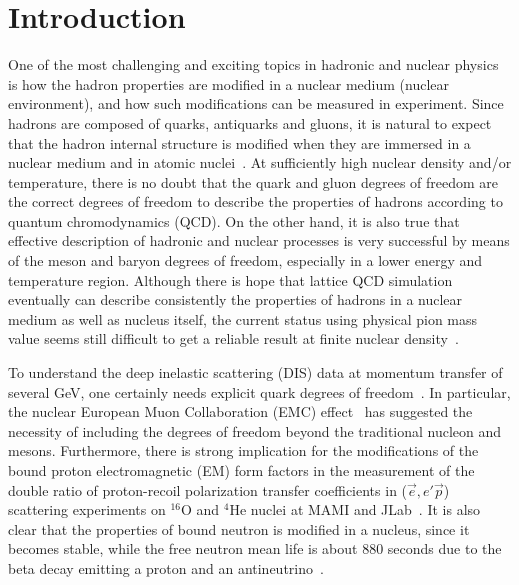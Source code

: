 \documentclass[preprint,aps,showpacs,floatfix]{revtex4}
\begin{document}
\section{Introduction}
\label{intro}


One of the most challenging and exciting topics in hadronic and nuclear physics is 
how the hadron properties are modified in a nuclear medium (nuclear environment), 
and how such modifications can be measured in experiment.
Since hadrons are composed of quarks, antiquarks and gluons, it is natural to expect that 
the hadron internal structure is modified when they are immersed in a nuclear medium   
and in atomic nuclei~\cite{Brown,Hatsuda,Guichon,QMCreview,Hayano,Brooks,Krein:2017usp}.
At sufficiently high nuclear density and/or temperature, there is no doubt that 
the quark and gluon degrees of freedom are the correct degrees of freedom to describe 
the properties of hadrons according to quantum chromodynamics (QCD). 
On the other hand, it is also true that effective description of hadronic and nuclear processes 
is very successful by means of the meson and baryon degrees of freedom,  
especially in a lower energy and temperature region.
Although there is hope that lattice QCD simulation eventually can describe consistently 
the properties of hadrons in a nuclear medium as well as nucleus itself, 
the current status using physical pion mass value  
seems still difficult to get a reliable result   
at finite nuclear density~\cite{lattice1,lattice2,lattice3,lattice4}.

To understand the deep inelastic scattering (DIS) data at momentum transfer of several GeV, 
one certainly needs explicit quark degrees of freedom~\cite{Cardarelli1995,Araujo1995,Denig2013}.
In particular, the nuclear  European Muon Collaboration (EMC) 
effect~\cite{NEMC,Hen} has suggested the necessity of  
including the degrees of freedom beyond the traditional nucleon and mesons.
Furthermore, there is strong implication for the modifications of the bound proton 
electromagnetic (EM) form factors in the measurement of the double ratio  
of proton-recoil polarization transfer coefficients in ($\vec{e},e'\vec{p}$) scattering experiments 
on $^{16}$O and $^4$He nuclei at MAMI and JLab~\cite{Strauch1,Strauch2,Strauch3}.
It is also clear that the properties of bound neutron is modified in a nucleus,  
since it becomes stable, while the free neutron mean life 
is about 880 seconds due to the beta decay emitting a proton 
and an antineutrino~\cite{Hen,neutron1}.
\end{document}
